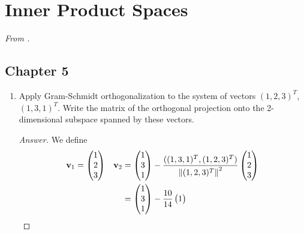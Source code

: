 \documentclass[../psets.tex]{subfiles}
\begin{document}
\section{Inner Product Spaces}
\emph{From \textcite{bib:Treil}.}
\subsection*{Chapter 5}
\begin{enumerate}[label={\textbf{3.\arabic*.}}]
    \item {}Apply Gram-Schmidt orthogonalization to the system of vectors $(1,2,3)^T$, $(1,3,1)^T$. Write the matrix of the orthogonal projection onto the 2-dimensional subspace spanned by these vectors.
    \begin{proof}[Answer]
        We define
        \begin{align*}
            \mathbf{v}_1 &=
            \begin{pmatrix}
                1\\
                2\\
                3\\
            \end{pmatrix}&
                \mathbf{v}_2 &=
                \begin{pmatrix}
                    1\\
                    3\\
                    1\\
                \end{pmatrix}
                -\frac{((1,3,1)^T,(1,2,3)^T)}{\norm{(1,2,3)^T}^2}
                \begin{pmatrix}
                    1\\
                    2\\
                    3\\
                \end{pmatrix}\\
            &&
                &=
                \begin{pmatrix}
                    1\\
                    3\\
                    1\\
                \end{pmatrix}
                -\frac{10}{14}
                \begin{pmatrix}
                    1\\

\end{pmatrix}
\end{align*}
\end{proof}
\end{enumerate}
\end{document}
